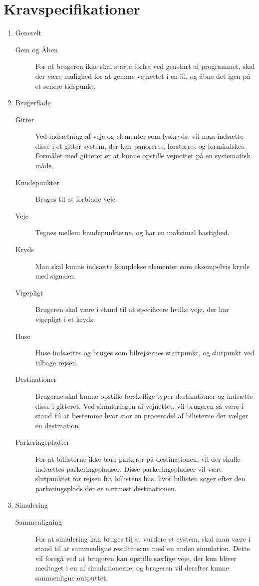 \chapter{Kravspecifikationer}\label{Kravspecifikationer}

\begin{enumerate}
\item Generelt
	\begin{description}
	\item [Gem og Åben] For at brugeren ikke skal starte forfra ved genstart af programmet, skal der være mulighed for at gemme vejnettet i en fil, og åbne det igen på et senere tidspunkt.
	\end{description}
\item Brugerflade
	\begin{description}
	\item [Gitter] Ved indsætning af veje og elementer som lyskryds, vil man indsætte disse i et gitter system, der kan panoreres, forstørres og formindskes. Formålet med gitteret er at kunne opstille vejnettet på en systematisk måde.
	\item [Knudepunkter] Bruges til at forbinde veje.
	\item [Veje] Tegnes mellem knudepunkterne, og har en maksimal hastighed.
	\item [Kryds] Man skal kunne indsætte komplekse elementer som eksempelvis kryds med signaler.
	\item [Vigepligt] Brugeren skal være i stand til at specificere hvilke veje, der har vigepligt i et kryds.
	\item [Huse] Huse indsættes og bruges som bilrejsernes startpunkt, og slutpunkt ved tilbage rejsen.
	\item [Destinationer] Brugerne skal kunne opstille forskellige typer destinationer og indsætte disse i gitteret. Ved simuleringen af vejnettet, vil brugeren så være i stand til at bestemme hvor stor en procentdel af bilisterne der vælger en destination.
	\item [Parkeringspladser] For at billisterne ikke bare parkerer på destinationen, vil der skulle indsættes parkeringspladser. Disse parkeringspladser vil være slutpunktet for rejsen fra billistens hus, hvor billisten søger efter den parkeringsplads der er nærmest destinationen.
	\end{description}
\item Simulering
    \begin{description}
    \item [Sammenligning] For at simulering kan bruges til at vurdere et system, skal man være i stand til at sammenligne resultaterne med en anden simulation. Dette vil foregå ved at brugeren kan opstille særlige veje, der kun bliver medtaget i en af simulationerne, og brugeren vil derefter kunne sammenligne outputtet.

\end{description}
\end{enumerate}

